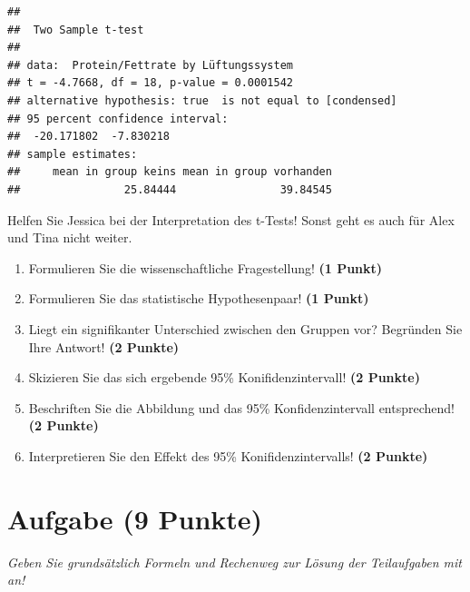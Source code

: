 \documentclass[a4paper, 9pt]{scrartcl}\usepackage[]{graphicx}\usepackage[]{xcolor}
\makeatletter
\newenvironment{kframe}{%
 \def\at@end@of@kframe{}%
 \ifinner\ifhmode%
  \def\at@end@of@kframe{\end{minipage}}%
  \begin{minipage}{\columnwidth}%
 \fi\fi%
 \def\FrameCommand##1{\hskip\@totalleftmargin \hskip-\fboxsep
 \colorbox{shadecolor}{##1}\hskip-\fboxsep
     \hskip-\linewidth \hskip-\@totalleftmargin \hskip\columnwidth}%
 \MakeFramed {\advance\hsize-\width
   \@totalleftmargin\z@ \linewidth\hsize
   \@setminipage}}%
 {\par\unskip\endMakeFramed%
 \at@end@of@kframe}
\newenvironment{knitrout}{}{} %
\makeatother
\begin{document}
\begin{knitrout}
\color{fgcolor}\begin{kframe}
\begin{verbatim}
## 
## 	Two Sample t-test
## 
## data:  Protein/Fettrate by Lüftungssystem
## t = -4.7668, df = 18, p-value = 0.0001542
## alternative hypothesis: true  is not equal to [condensed]
## 95 percent confidence interval:
##  -20.171802  -7.830218
## sample estimates:
##     mean in group keins mean in group vorhanden 
##                25.84444                39.84545
\end{verbatim}
\end{kframe}
\end{knitrout}

Helfen Sie Jessica bei der Interpretation des t-Tests! Sonst geht es auch für Alex und Tina nicht weiter.

\begin{enumerate}
  \item Formulieren Sie die wissenschaftliche Fragestellung! \textbf{(1 Punkt)}
  \item Formulieren Sie das statistische Hypothesenpaar! \textbf{(1 Punkt)}
\item Liegt ein signifikanter Unterschied zwischen den Gruppen vor? Begründen Sie Ihre Antwort! \textbf{(2 Punkte)}
\item Skizieren Sie das sich ergebende 95\% Konifidenzintervall! \textbf{(2 Punkte)}
\item Beschriften Sie die Abbildung und das 95\% Konfidenzintervall entsprechend! \textbf{(2 Punkte)}  
\item Interpretieren Sie den Effekt des 95\% Konifidenzintervalls! \textbf{(2 Punkte)}
\end{enumerate} 
\clearpage

\section{Aufgabe \hfill (9 Punkte)}

\textit{Geben Sie grundsätzlich Formeln und Rechenweg zur Lösung der Teilaufgaben mit an!} \\[1Ex]
 
\end{document}
